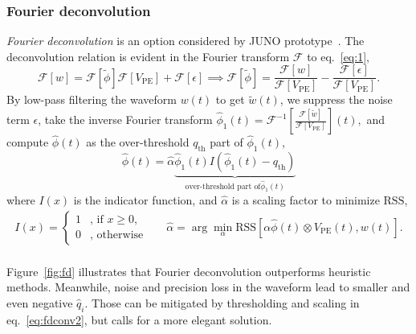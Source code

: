 \subsubsection{Fourier deconvolution}
\textit{Fourier deconvolution} is an option considered by JUNO prototype~\cite{zhang_comparison_2019}. The deconvolution relation is evident in the Fourier transform $\mathcal{F}$ to eq.~\eqref{eq:1},
\begin{equation}
  \label{eq:fourier}
  \mathcal{F}[w]  = \mathcal{F}[\tilde{\phi}]\mathcal{F}[V_\mathrm{PE}] + \mathcal{F}[\epsilon]
  \implies \mathcal{F}[\tilde{\phi}]  = \frac{\mathcal{F}[w]}{\mathcal{F}[V_\mathrm{PE}]} - \frac{\mathcal{F}[\epsilon]}{\mathcal{F}[V_\mathrm{PE}]}.
\end{equation}
By low-pass filtering the waveform $w(t)$ to get $\tilde{w}(t)$, we suppress the noise term $\epsilon$, take the inverse Fourier transform $\hat{\phi}_1(t) = \mathcal{F}^{-1}\left[\frac{\mathcal{F}[\tilde{w}]}{\mathcal{F}[V_\mathrm{PE}]}\right](t),$ and compute $\hat{\phi}(t)$ as the over-threshold $q_\mathrm{th}$ part of $\hat{\phi}_1(t)$,
\begin{equation}
  \label{eq:fdconv2}
    \hat{\phi}(t) = \hat{\alpha}\underbrace{\hat{\phi}_1(t) I\left(\hat{\phi}_1(t) - q_\mathrm{th}\right)}_{\text{over-threshold part of} \hat{\phi}_1(t)}  
\end{equation}
where $I(x)$ is the indicator function, and $\hat{\alpha}$ is a scaling factor to minimize $\mathrm{RSS}$,
\begin{equation*}
  \begin{aligned}
  \label{eq:id}
  I(x) = \left\{
    \begin{array}{ll}
      1 & \mbox{, if $x\ge0$}, \\
      0 & \mbox{, otherwise}
    \end{array}
    \right.
    \quad~~~
    \hat{\alpha} = \arg \underset{\alpha}{\min}\mathrm{RSS}\left[\alpha\hat{\phi}(t)\otimes V_\mathrm{PE}(t),w(t)\right]. \\
  \end{aligned}
\end{equation*}

Figure~\ref{fig:fd} illustrates that Fourier deconvolution outperforms heuristic methods.  Meanwhile, noise and precision loss in the waveform lead to smaller and even negative $\hat{q}_i$. Those can be mitigated by thresholding and scaling in eq.~\eqref{eq:fdconv2}, but calls for a more elegant solution.

